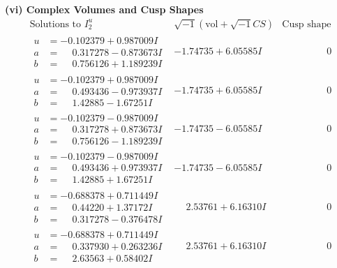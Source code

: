 \documentclass[1p]{elsarticle_modified}
\theoremstyle{definition}
\newcommand{\I}{\sqrt{-1}}
\begin{document}
\newpage\flushleft \textbf{(vi) Complex Volumes and Cusp Shapes}
$$\begin{array}{c|c|c}  
\text{Solutions to }I^u_{2}& \I (\text{vol} + \sqrt{-1}CS) & \text{Cusp shape}\\
 \hline 
\begin{aligned}
u &= -0.102379 + 0.987009 I \\
a &= \phantom{-}0.317278 - 0.873673 I \\
b &= \phantom{-}0.756126 + 1.189239 I\end{aligned}
 & -1.74735 + 6.05585 I & \phantom{-0.000000 } 0 \\ \hline\begin{aligned}
u &= -0.102379 + 0.987009 I \\
a &= \phantom{-}0.493436 - 0.973937 I \\
b &= \phantom{-}1.42885 - 1.67251 I\end{aligned}
 & -1.74735 + 6.05585 I & \phantom{-0.000000 } 0 \\ \hline\begin{aligned}
u &= -0.102379 - 0.987009 I \\
a &= \phantom{-}0.317278 + 0.873673 I \\
b &= \phantom{-}0.756126 - 1.189239 I\end{aligned}
 & -1.74735 - 6.05585 I & \phantom{-0.000000 } 0 \\ \hline\begin{aligned}
u &= -0.102379 - 0.987009 I \\
a &= \phantom{-}0.493436 + 0.973937 I \\
b &= \phantom{-}1.42885 + 1.67251 I\end{aligned}
 & -1.74735 - 6.05585 I & \phantom{-0.000000 } 0 \\ \hline\begin{aligned}
u &= -0.688378 + 0.711449 I \\
a &= \phantom{-}0.44220 + 1.37172 I \\
b &= \phantom{-}0.317278 - 0.376478 I\end{aligned}
 & \phantom{-}2.53761 + 6.16310 I & \phantom{-0.000000 } 0 \\ \hline\begin{aligned}
u &= -0.688378 + 0.711449 I \\
a &= \phantom{-}0.337930 + 0.263236 I \\
b &= \phantom{-}2.63563 + 0.58402 I\end{aligned}
 & \phantom{-}2.53761 + 6.16310 I & \phantom{-0.000000 } 0 \\ \hline\begin{aligned}

\end{aligned}
\end{array}$$
\end{document}
